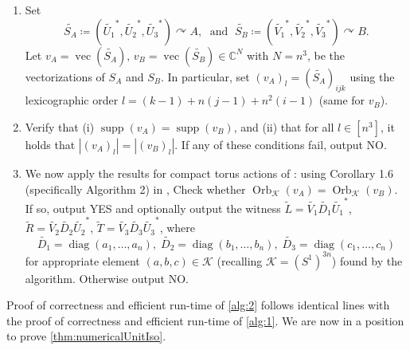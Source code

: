\documentclass[11pt]{article}
\numberwithin{equation}{section}
\theoremstyle{remark}
\DeclareMathOperator{\diag}{diag}
\DeclareMathOperator{\Orb}{Orb}
\DeclareMathOperator{\supp}{supp}
\DeclareMathOperator{\vecc}{vec}
\newcommand{\CC}{\mathbb{C}}
\newcommand{\cK}{\mathcal{K}}
\begin{document}
\begin{algorithm}[H]
\begin{enumerate}[label=Step \arabic*]
    \item\label{alg2Step2} Set
    \[
    \widetilde{S_A}\coloneqq (\widetilde{U_1}^*, \widetilde{U_2}^*, \widetilde{U_3}^*) \curvearrowright A,\;\text{ and }\;
    \widetilde{S_B}\coloneqq (\widetilde{V_1}^*, \widetilde{V_2}^*, \widetilde{V_3}^*) \curvearrowright B.
    \]
    Let $v_A=\vecc(\widetilde{S_A}),\,v_B=\vecc(\widetilde{S_B})\in\CC^{N}$ with $N=n^3$, be the vectorizations of $S_A$ and $S_B$. In particular, set $(v_A)_l = (\widetilde{S_A})_{ijk}$ using the lexicographic order $l=(k-1)+n(j-1)+n^2(i-1)$ (same for $v_B$).
    
    \item\label{alg2Step3} Verify that (i) $\supp(v_A) = \supp(v_B)$, and (ii) that for all $l\in [n^3]$, it holds that $|(v_A)_l| = |(v_B)_l|$. If any of these conditions fail, output \textsf{NO}.
    
    \item\label{alg2Step4} We now apply the results for compact torus actions of \cite{burgisser_et_alCCC.2021.32}: using Corollary 1.6 (specifically Algorithm 2) in \cite{burgisser_et_alCCC.2021.32}, 
    Check whether $\Orb_\cK(v_A) = \Orb_\cK(v_B)$. If so, output \textsf{YES} and optionally output the witness $\widetilde{L} = \widetilde{V_1} \widetilde{D_1} \widetilde{U_1}^*$, $\widetilde{R} = \widetilde{V_2}\widetilde{D_2}\widetilde{U_2}^*$, $\widetilde{T} = \widetilde{V_3}\widetilde{D_3}\widetilde{U_3}^*$, where
    \[
    \widetilde{D_1} = \diag(a_1,\dots,a_n),\; \widetilde{D_2} = \diag(b_1,\dots,b_n), \; \widetilde{D_3} = \diag(c_1,\dots,c_n)
    \]
    for appropriate element $(a, b, c) \in \cK$ (recalling $\cK = (S^1)^{3n}$) found by the algorithm.
    Otherwise output \textsf{NO}.
    \end{enumerate}
\end{algorithm}

Proof of correctness and efficient run-time of \cref{alg:2} follows identical lines with the proof of correctness and efficient run-time of \cref{alg:1}.
We are now in a position to prove \cref{thm:numericalUnitIso}.
\end{document}
